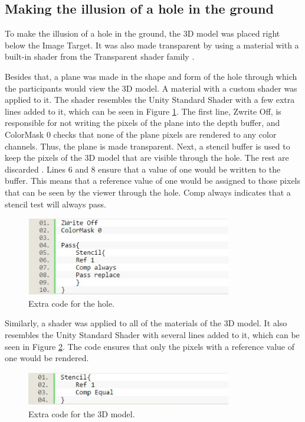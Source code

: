 \subsection{Making the illusion of a hole in the ground}
To make the illusion of a hole in the ground, the 3D model was placed right below the Image Target. It was also made transparent by using a material with a built-in shader from the Transparent shader family \cite{unity_legacy_shaders}.

Besides that, a plane was made in the shape and form of the hole through which the participants would view the 3D model. A material with a custom shader was applied to it. The shader resembles the Unity Standard Shader \cite{unity_standard_shader} with  a few extra lines added to it, which can be seen in Figure \ref{fig:imp4}. The first line, Zwrite Off, is responsible for not writing the pixels of the plane into the depth buffer, and ColorMask 0 checks that none of the plane pixels are rendered to any color channels. Thus, the plane is made transparent. Next, a stencil buffer is used to keep the pixels of the 3D model that are visible through the hole. The rest are discarded \cite{stencil_buffer}. Lines 6 and 8 ensure that a value of one would be written to the buffer. This means that a reference value of one would be assigned to those pixels that can be seen by the viewer through the hole. Comp always indicates that a stencil test will always pass. 

\begin{figure}[h!]
    \centering
    \includegraphics[width=0.8\textwidth]{figures/imp4.jpg}
    \caption{Extra code for the hole.}\label{fig:imp4}
\end{figure}

Similarly, a shader was applied to all of the materials of the 3D model. It also resembles the Unity Standard Shader with several lines added to it, which can be seen in Figure \ref{fig:imp5}. The code ensures that only the pixels with a reference value of one would be rendered.

\begin{figure}[h!]
    \centering
    \includegraphics[width=0.8\textwidth]{figures/imp5.jpg}
    \caption{Extra code for the 3D model.}\label{fig:imp5}
\end{figure}

